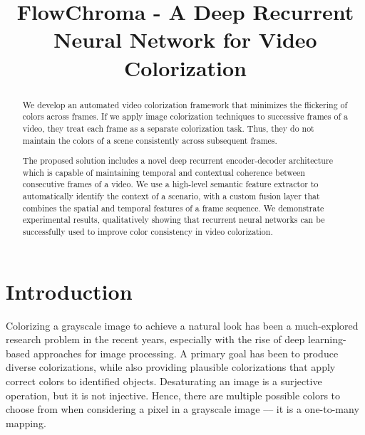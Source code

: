 \documentclass[10pt,twocolumn,letterpaper]{article}
\begin{document}
\title{FlowChroma - A Deep Recurrent Neural Network for Video Colorization}


\maketitle
\ifwacvfinal\thispagestyle{empty}\fi
\begin{abstract}
   We develop an automated video colorization framework that minimizes the flickering of colors across frames. If we apply image colorization techniques to successive frames of a video, they treat each frame as a separate colorization task. Thus, they do not maintain the colors of a scene consistently across subsequent frames.

The proposed solution includes a novel deep recurrent encoder-decoder architecture which is capable of maintaining temporal and contextual coherence between consecutive frames of a video. We use a high-level semantic feature extractor to automatically identify the context of a scenario, with a custom fusion layer that combines the spatial and temporal features of a frame sequence. We demonstrate experimental results, qualitatively showing that recurrent neural networks can be successfully used to improve color consistency in video colorization.
\end{abstract}

\section{Introduction}
Colorizing a grayscale image to achieve a natural look has been a much-explored research problem in the recent years, especially with the rise of deep learning-based approaches for image processing. A primary goal has been to produce diverse colorizations, while also providing plausible colorizations that apply correct colors to identified objects. Desaturating an image is a surjective operation, but it is not injective. Hence, there are multiple possible colors to choose from when considering a pixel in a grayscale image --– it is a one-to-many mapping.
\end{document}
